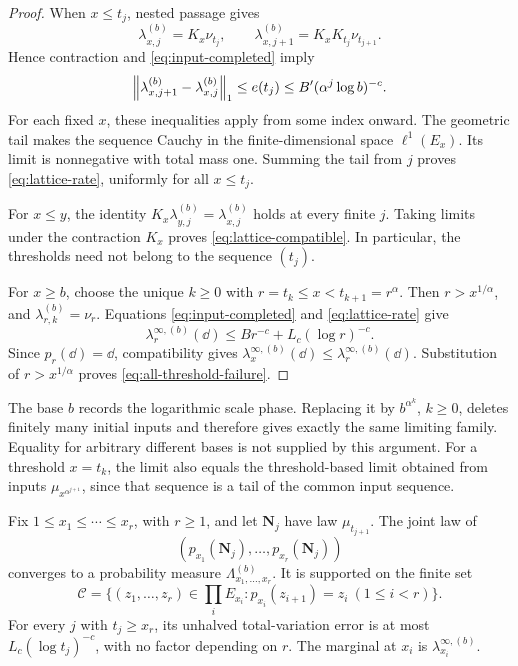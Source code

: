 \begin{proof}
When $x\leq t_j$, nested passage gives
\[
 \lambda_{x,j}^{(b)}=K_x\nu_{t_j},\qquad
 \lambda_{x,j+1}^{(b)}=K_xK_{t_j}\nu_{t_{j+1}}.
\]
Hence contraction and \eqref{eq:input-completed} imply
\[
 \left\|\lambda_{x,j+1}^{(b)}-\lambda_{x,j}^{(b)}\right\|_1
 \leq e(t_j)\leq B'(\alpha^j\log b)^{-c}.
\]
For each fixed $x$, these inequalities apply from some index onward.
The geometric tail makes the sequence Cauchy in the finite-dimensional
space $\ell^1(E_x)$. Its limit is nonnegative with total mass one.
Summing the tail from $j$ proves \eqref{eq:lattice-rate}, uniformly for
all $x\leq t_j$.

For $x\leq y$, the identity
$K_x\lambda_{y,j}^{(b)}=\lambda_{x,j}^{(b)}$ holds at every finite $j$.
Taking limits under the contraction $K_x$ proves
\eqref{eq:lattice-compatible}. In particular, the thresholds need not
belong to the sequence $(t_j)$.

For $x\geq b$, choose the unique $k\geq0$ with
$r=t_k\leq x<t_{k+1}=r^\alpha$. Then $r>x^{1/\alpha}$, and
$\lambda_{r,k}^{(b)}=\nu_r$. Equations \eqref{eq:input-completed} and
\eqref{eq:lattice-rate} give
\[
 \lambda_r^{\infty,(b)}(\dd)\leq Br^{-c}+L_c(\log r)^{-c}.
\]
Since $p_r(\dd)=\dd$, compatibility gives
$\lambda_x^{\infty,(b)}(\dd)\leq\lambda_r^{\infty,(b)}(\dd)$.
Substitution of $r>x^{1/\alpha}$ proves
\eqref{eq:all-threshold-failure}.
\end{proof}

The base $b$ records the logarithmic scale phase. Replacing it by
$b^{\alpha^k}$, $k\geq0$, deletes finitely many initial inputs and
therefore gives exactly the same limiting family. Equality for arbitrary
different bases is not supplied by this argument. For a threshold
$x=t_k$, the limit also equals the threshold-based limit obtained from
inputs $\mu_{x^{\alpha^{j+1}}}$, since that sequence is a tail of the
common input sequence.

\begin{corollary}\label{cor:joint-entry}
Fix $1\leq x_1\leq\cdots\leq x_r$, with $r\geq1$, and let
$\mathbf N_j$ have law $\mu_{t_{j+1}}$. The joint law of
\[
 (p_{x_1}(\mathbf N_j),\ldots,p_{x_r}(\mathbf N_j))
\]
converges to a probability measure $\Lambda_{x_1,\ldots,x_r}^{(b)}$.
It is supported on the finite set
\[
 \mathcal C=\{(z_1,\ldots,z_r)\in\textstyle\prod_i E_{x_i}:
                p_{x_i}(z_{i+1})=z_i\ (1\leq i<r)\}.
\]
For every $j$ with $t_j\geq x_r$, its unhalved total-variation error
is at most $L_c(\log t_j)^{-c}$, with no factor depending on $r$.
The marginal at $x_i$ is $\lambda_{x_i}^{\infty,(b)}$.
\end{corollary}

